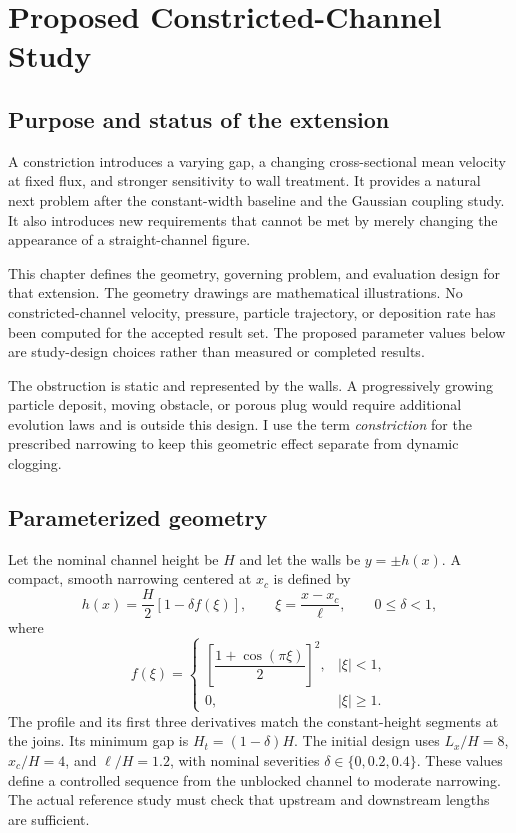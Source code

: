 \chapter{Proposed Constricted-Channel Study}\label{ch:constriction}

\section{Purpose and status of the extension}
A constriction introduces a varying gap, a changing cross-sectional mean
velocity at fixed flux, and stronger sensitivity to wall treatment.
It provides a natural next problem after the constant-width baseline and
the Gaussian coupling study. It also introduces new requirements that
cannot be met by merely changing the appearance of a straight-channel
figure.

This chapter defines the geometry, governing problem, and evaluation design
for that extension. The geometry drawings are mathematical illustrations.
No constricted-channel velocity, pressure, particle trajectory, or deposition
rate has been computed for the accepted result set. The proposed parameter
values below are study-design choices rather than measured or completed
results.

The obstruction is static and represented by the walls. A progressively
growing particle deposit, moving obstacle, or porous plug would require
additional evolution laws and is outside this design. I use the term
\emph{constriction} for the prescribed narrowing to keep this geometric
effect separate from dynamic clogging.

\section{Parameterized geometry}
Let the nominal channel height be $H$ and let the walls be
$y=\pm h(x)$. A compact, smooth narrowing centered at $x_c$ is defined by
\begin{equation}
 h(x)=\frac{H}{2}[1-\delta f(\xi)],\qquad
 \xi=\frac{x-x_c}{\ell},\qquad 0\leq\delta<1,
 \label{eq:constriction_height}
\end{equation}
where
\begin{equation}
 f(\xi)=
 \begin{cases}
 \left[\dfrac{1+\cos(\pi\xi)}{2}\right]^2,&|\xi|<1,\\[2mm]
 0,&|\xi|\geq1.
 \end{cases}
 \label{eq:constriction_profile}
\end{equation}
The profile and its first three derivatives match the constant-height
segments at the joins. Its minimum gap is $H_t=(1-\delta)H$. The initial
design uses $L_x/H=8$, $x_c/H=4$, and $\ell/H=1.2$, with nominal severities
$\delta\in\{0,0.2,0.4\}$. These values define a controlled sequence from
the unblocked channel to moderate narrowing. The actual reference study
must check that upstream and downstream lengths are sufficient.

